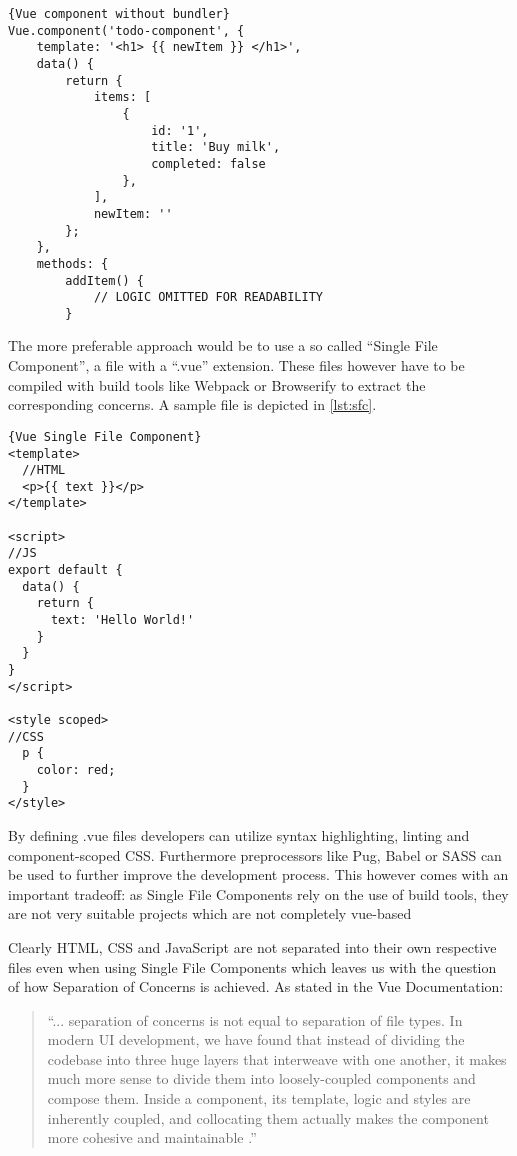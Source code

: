 \begin{lstlisting}[caption=Vue component without bundler, captionpos=b, style=htmlcssjs]{Vue component without bundler}
Vue.component('todo-component', {
    template: '<h1> {{ newItem }} </h1>',
    data() {
        return {
            items: [
                {
                    id: '1',
                    title: 'Buy milk',
                    completed: false
                },
            ],
            newItem: ''
        };
    },
    methods: {
        addItem() {
            // LOGIC OMITTED FOR READABILITY
        }
\end{lstlisting}
The more preferable approach would be to use a so called “Single File Component”, a file with a “.vue” extension. These files however have to be compiled with build tools like Webpack or Browserify to extract the corresponding concerns. A sample file is depicted in \autoref{lst:sfc}. \newline

\begin{lstlisting}[caption=Vue Single File Component, label={lst:sfc}, captionpos=b, style=htmlcssjs]{Vue Single File Component}
<template>
  //HTML
  <p>{{ text }}</p>
</template>

<script>
//JS
export default {
  data() {
    return {
      text: 'Hello World!'
    }
  }
}
</script>

<style scoped>
//CSS
  p {
    color: red;
  }
</style>
\end{lstlisting}

By defining .vue files developers can utilize syntax highlighting, linting and component-scoped CSS. Furthermore preprocessors like Pug, Babel or SASS can be used to further improve the development process. This however comes with an important tradeoff: as Single File Components rely on the use of build tools, they are not very suitable projects which are not completely vue-based

Clearly HTML, CSS and JavaScript are not separated into their own respective files even when using Single File Components which leaves us with the question of how Separation of Concerns is achieved. As stated in the Vue Documentation: 

\begin{quotation}
“... separation of concerns is not equal to separation of file types. In modern UI development, we have found that instead of dividing the codebase into three huge layers that interweave with one another, it makes much more sense to divide them into loosely-coupled components and compose them. Inside a component, its template, logic and styles are inherently coupled, and collocating them actually makes the component more cohesive and maintainable \cite{VueSeparationofConcerns:online}.” 
\end{quotation}

